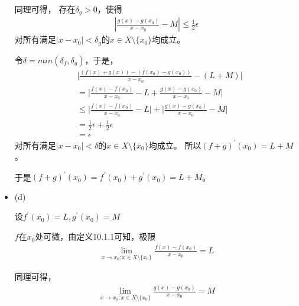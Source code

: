 \documentclass{article}
\begin{document}
\begin{itemize}
        同理可得，
        存在$\delta_g > 0$，使得
        \begin{align*}
          |\frac{g(x) - g(x_0)}{x - x_0} - M | \leq \frac{1}{2}\epsilon
        \end{align*}
        对所有满足$|x - x_0| < \delta_g$的$x \in X \setminus \{x_0\}$均成立。

        令$\delta = min(\delta_f, \delta_g)$，于是，
        \begin{align*}
           & \big|\frac{(f(x) + g(x)) - (f(x_0) - g(x_0))}{x - x_0} - (L + M)  \big|                          \\
           & = \big|\frac{f(x) - f(x_0)}{x - x_0} - L + \frac{g(x) - g(x_0)}{x - x_0} - M \big|               \\
           & \leq \big|\frac{f(x) - f(x_0)}{x - x_0} - L \big| + \big|\frac{g(x) - g(x_0)}{x - x_0} - M \big| \\
           & = \frac{1}{2}\epsilon + \frac{1}{2}\epsilon                                                      \\
           & = \epsilon
        \end{align*}
        对所有满足$|x - x_0| < \delta$的$x \in X \setminus \{x_0\}$均成立。
        所以$(f + g)^\prime(x_0) = L + M$。

        于是$(f + g)^\prime(x_0) = f^\prime(x_0) + g^\prime(x_0) = L + M$。

  \item (d)

        设$f^\prime(x_0) = L, g^\prime(x_0) = M$

        $f$在$x_0$处可微，由定义10.1.1可知，极限
        \begin{align*}
          \lim\limits_{x \to x_0; x \in X \setminus \{x_0\}} \frac{f(x) - f(x_0)}{x - x_0} = L
        \end{align*}

        同理可得，
        \begin{align*}
          \lim\limits_{x \to x_0; x \in X \setminus \{x_0\}} \frac{g(x) - g(x_0)}{x - x_0} = M
        \end{align*}


\end{itemize}
\end{document}
